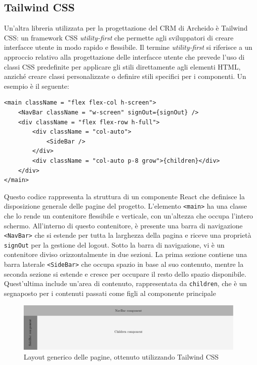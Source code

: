 \documentclass[target=bach,aauheader=,style=]{thud}
\begin{document}
\subsection{Tailwind CSS}
\noindent Un'altra libreria utilizzata per la progettazione del CRM di Archeido è Tailwind CSS: un framework CSS \textit{utility-first} che permette agli sviluppatori di creare interfacce utente in modo rapido e flessibile. Il termine \textit{utility-first} si riferisce a un approccio relativo alla progettazione delle interfacce utente che prevede l'uso di classi CSS predefinite per applicare gli stili direttamente agli elementi HTML, anziché creare classi personalizzate o definire stili specifici per i componenti. Un esempio è il seguente:

\begin{lstlisting}[caption=Parte del file \texttt{app.tsx} del CRM]
<main className = "flex flex-col h-screen">
    <NavBar className = "w-screen" signOut={signOut} />
    <div className = "flex flex-row h-full">
        <div className = "col-auto">
            <SideBar />
        </div>
        <div className = "col-auto p-8 grow">{children}</div>
    </div>
</main> 
\end{lstlisting}

\noindent Questo codice rappresenta la struttura di un componente React che definisce la disposizione generale delle pagine del progetto. L'elemento \texttt{<main>} ha una classe che lo rende un contenitore flessibile e verticale, con un'altezza che occupa l'intero schermo. All'interno di questo contenitore, è presente una barra di navigazione \texttt{<NavBar>} che si estende per tutta la larghezza della pagina e riceve una proprietà \texttt{signOut} per la gestione del logout. Sotto la barra di navigazione, vi è un contenitore diviso orizzontalmente in due sezioni. La prima sezione contiene una barra laterale \texttt{<SideBar>} che occupa spazio in base al suo contenuto, mentre la seconda sezione si estende e cresce per occupare il resto dello spazio disponibile. Quest'ultima include un'area di contenuto, rappresentata da \texttt{{children}}, che è un segnaposto per i contenuti passati come figli al componente principale

\begin{figure}[H]
    \centering
    \includegraphics[width=1\textwidth]{img/layout.pdf} 
    \caption{Layout generico delle pagine, ottenuto utilizzando Tailwind CSS}
\end{figure}
\end{document}
